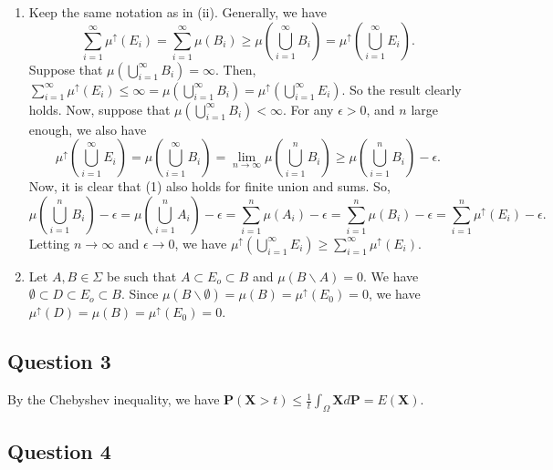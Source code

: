 \documentclass{article}
\begin{document}
\begin{enumerate}[label=(\roman*)]
    \item Keep the same notation as in (ii). Generally, we have  
    $$ \sum_{i=1}^\infty \mu^{\uparrow}(E_i) = \sum_{i=1}^\infty \mu(B_i) 
    \geq \mu\left( \bigcup_{i=1}^\infty B_i \right) = \mu^{\uparrow}\left( \bigcup_{i=1}^\infty E_i \right).$$ 
    Suppose that $\mu\left( \bigcup_{i=1}^\infty B_i \right) = \infty$. Then, 
    $ \sum_{i=1}^\infty \mu^{\uparrow}(E_i) \leq \infty = \mu\left( \bigcup_{i=1}^\infty B_i \right) = 
    \mu^{\uparrow}\left( \bigcup_{i=1}^\infty E_i \right)$. So the result clearly holds. 
    Now, suppose that $\mu\left( \bigcup_{i=1}^\infty B_i \right) < \infty$.  
    For any $\epsilon>0$, and $n$ large enough, we also have 
    $$ \mu^{\uparrow}\left( \bigcup_{i=1}^\infty E_i \right) = \mu\left( \bigcup_{i=1}^\infty B_i \right) 
    = \lim_{n\to\infty}\mu\left( \bigcup_{i=1}^n B_i \right) 
    \geq \mu\left( \bigcup_{i=1}^n B_i \right) - \epsilon. 
    $$ Now, it is clear that (1) also holds for finite union and sums. So, 
    $$
    \mu\left( \bigcup_{i=1}^n B_i \right) - \epsilon 
    = \mu\left( \bigcup_{i=1}^n A_i \right) - \epsilon 
    = \sum_{i=1}^n \mu\left( A_i \right) - \epsilon
    = \sum_{i=1}^n \mu\left( B_i \right) - \epsilon
    = \sum_{i=1}^n \mu^{\uparrow}\left( E_i \right) - \epsilon. $$
    Letting $n\to\infty$ and $\epsilon\to 0$, we have $\mu^{\uparrow}\left( \bigcup_{i=1}^\infty E_i \right) 
    \geq \sum_{i=1}^\infty \mu^{\uparrow}\left( E_i \right)$. 

    \item Let $A,B \in \Sigma$ be such that $A \subset E_o \subset B$ and $\mu(B\backslash A)=0$. 
    We have $\emptyset \subset D \subset E_o \subset B$. Since $\mu(B\backslash \emptyset ) = 
    \mu(B) = \mu^\uparrow(E_0) = 0$, we have $\mu^\uparrow(D) = \mu(B) = \mu^\uparrow(E_0) = 0$.

\end{enumerate}

\subsection*{Question 3}

By the Chebyshev inequality, we have 
$\mathbf{P}({\mathbf{X}>t}) \leq \frac{1}{t}\int_{\Omega} \mathbf{X} d\mathbf{P} = E(\mathbf{X})$.  

\subsection*{Question 4}
 
\end{document}
